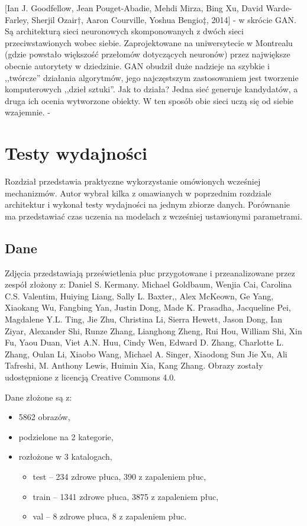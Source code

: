 \documentclass[12pt,a4paper,twoside,titlepage,openright]{book}
\begin{document}
[Ian J. Goodfellow, Jean Pouget-Abadie, Mehdi Mirza, Bing Xu, David Warde-Farley, Sherjil Ozair†, Aaron Courville, Yoshua Bengio‡, 2014] - w skrócie GAN. Są architekturą sieci neuronowych skomponowanych z dwóch sieci przeciwstawionych wobec siebie. Zaprojektowane na uniwersytecie w Montrealu (gdzie powstało większość przełomów dotyczących neuronów) przez największe obecnie autorytety w dziedzinie. GAN obudził duże nadzieje na szybkie i ,,twórcze'' działania algorytmów, jego najczęstszym zastosowaniem jest tworzenie komputerowych ,,dzieł sztuki''. Jak to działa? Jedna sieć generuje kandydatów, a druga ich ocenia wytworzone obiekty. W ten sposób obie sieci uczą się od siebie wzajemnie. - \cite{NIPS2014_5423}



\chapter{Testy wydajności}
Rozdział przedstawia praktyczne wykorzystanie omówionych wcześniej mechanizmów. Autor wybrał kilka z omawianych w poprzednim rozdziale architektur i wykonał testy wydajności na jednym zbiorze danych. Porównanie ma przedstawiać czas uczenia na modelach z wcześniej ustawionymi parametrami.

\section{Dane}
Zdjęcia przedstawiają prześwietlenia płuc przygotowane i przeanalizowane przez zespół złożony z: Daniel S. Kermany. Michael Goldbaum, Wenjia Cai, Carolina C.S. Valentim, Huiying Liang, Sally L. Baxter,, Alex McKeown, Ge Yang, Xiaokang Wu, Fangbing Yan, Justin Dong, Made K. Prasadha, Jacqueline Pei, Magdalene Y.L. Ting, Jie Zhu, Christina Li, Sierra Hewett, Jason Dong, Ian Ziyar, Alexander Shi, Runze Zhang, Lianghong Zheng, Rui Hou, William Shi, Xin Fu, Yaou Duan, Viet A.N. Huu, Cindy Wen, Edward D. Zhang, Charlotte L. Zhang, Oulan Li, Xiaobo Wang, Michael A. Singer, Xiaodong Sun Jie Xu, Ali Tafreshi, M. Anthony Lewis, Huimin Xia, Kang Zhang. Obrazy zostały udostępnione z licencją Creative Commons 4.0. \cite{siteCell}

Dane złożone są z:
\begin{itemize}
\item 5862 obrazów,
\item podzielone na 2 kategorie,
\item rozłożone w 3 katalogach,
\begin{itemize}
\item test -- 234 zdrowe płuca, 390 z zapaleniem płuc,
\item train -- 1341 zdrowe płuca, 3875 z zapaleniem płuc,
\item val -- 8 zdrowe płuca, 8 z zapaleniem płuc.
\end{itemize}
\end{itemize}
\end{document}
